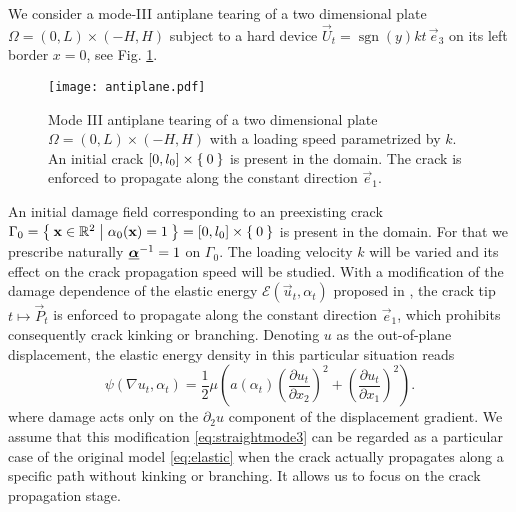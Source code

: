 We consider a mode-\RN{3} antiplane tearing of a two dimensional plate $\Omega=(0,L)\times(-H,H)$ subject to a hard device $\vec{U}_t=\operatorname{sgn}(y)kt\,\vec{e}_3$ on its left border $x=0$, see Fig. \ref{fig:antiplane}.
\begin{figure}[htbp]
\centering
\texttt{[image: antiplane.pdf]}
\caption{Mode III antiplane tearing of a two dimensional plate $\Omega=(0,L)\times(-H,H)$ with a loading speed parametrized by $k$. An initial crack $[0,l_0]\times\Set{0}$ is present in the domain. The crack is enforced to propagate along the constant direction $\vec{e}_1$.} \label{fig:antiplane}
\end{figure}
An initial damage field corresponding to an preexisting crack $\Gamma_0=\set{\vec{x}\in\mathbb{R}^2|\alpha_0(\vec{x})=1}=[0,l_0]\times\set{0}$ is present in the domain. For that we prescribe naturally $\dvec^{-1}=1$ on $\Gamma_0$. The loading velocity $k$ will be varied and its effect on the crack propagation speed will be studied. With a modification of the damage dependence of the elastic energy $\mathcal{E}(\vec{u}_t,\alpha_t)$ proposed in \cite{Bourdin:2011}, the crack tip $t\mapsto\vec{P}_t$ is enforced to propagate along the constant direction $\vec{e}_1$, which prohibits consequently crack kinking or branching. Denoting $u$ as the out-of-plane displacement, the elastic energy density in this particular situation reads
\begin{equation} \label{eq:straightmode3}
\psi(\nabla u_t,\alpha_t)=\frac{1}{2}\mu\left(a(\alpha_t)\left(\frac{\partial u_t}{\partial x_2}\right)^2+\left(\frac{\partial u_t}{\partial x_1}\right)^2\right).
\end{equation}
where damage acts only on the $\partial_2 u$ component of the displacement gradient. We assume that this modification \eqref{eq:straightmode3} can be regarded as a particular case of the original model \eqref{eq:elastic} when the crack actually propagates along a specific path without kinking or branching. It allows us to focus on the crack propagation stage.

